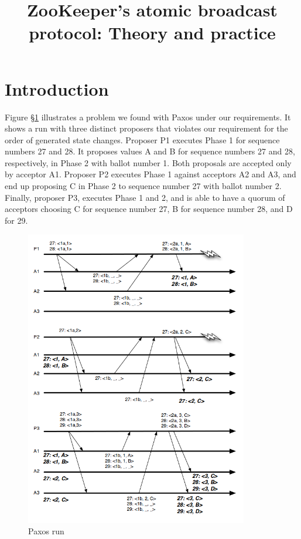 \documentclass[10pt,onecolumn]{article}
\begin{document}
\title{ZooKeeper's atomic broadcast protocol: Theory and practice}
\author{}
\date{}
\maketitle

\section{Introduction} \label{sec:intro}
Figure \S\ref{fig:paxos_run} illustrates a problem we found with Paxos under our requirements. It shows a run with three distinct proposers that violates our requirement for the order of generated state changes. Proposer P1 executes Phase 1 for sequence numbers 27 and 28. It proposes values A and B for sequence numbers 27 and 28, respectively, in Phase 2 with ballot number 1. Both proposals are accepted only by acceptor A1. Proposer P2 executes Phase 1 against acceptors A2 and A3, and end up proposing C in Phase 2 to sequence number 27 with ballot number 2. Finally, proposer P3, executes Phase 1 and 2, and is able to have a quorum of acceptors choosing C for sequence number 27, B for sequence number 28, and D for 29.

\begin{figure}[h]
\begin{center}
\includegraphics[height=13cm]{paxos_run.png}
\end{center}
\caption{Paxos run}
\label{fig:paxos_run}
\end{figure}
\end{document}
